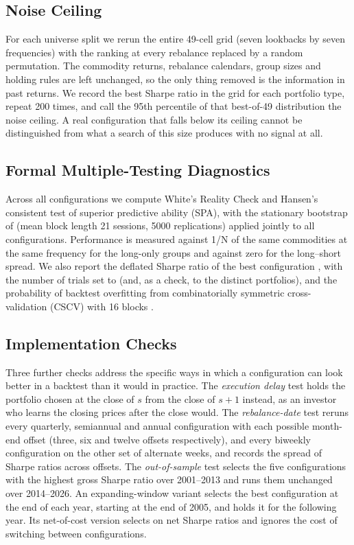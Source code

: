 \documentclass[commodities,article,submit,pdftex,moreauthors]{Definitions/mdpi}
\begin{document}
\subsection{Noise Ceiling}

For each universe split we rerun the entire 49-cell grid (seven lookbacks by seven frequencies) with the ranking at every rebalance replaced by a random permutation. The commodity returns, rebalance calendars, group sizes and holding rules are left unchanged, so the only thing removed is the information in past returns. We record the best Sharpe ratio in the grid for each portfolio type, repeat 200 times, and call the 95th percentile of that best-of-49 distribution the noise ceiling. A real configuration that falls below its ceiling cannot be distinguished from what a search of this size produces with no signal at all.

\subsection{Formal Multiple-Testing Diagnostics}

Across all \nConfigs{} configurations we compute White's Reality Check and Hansen's consistent test of superior predictive ability (SPA), with the stationary bootstrap of \citet{politis1994} (mean block length 21 sessions, 5000 replications) applied jointly to all configurations. Performance is measured against 1/N of the same commodities at the same frequency for the long-only groups and against zero for the long--short spread. We also report the deflated Sharpe ratio of the best configuration \citep{bailey2014}, with the number of trials set to \nConfigs{} (and, as a check, to the \nDistinct{} distinct portfolios), and the probability of backtest overfitting from combinatorially symmetric cross-validation (CSCV) with 16 blocks \citep{bailey2017}.

\subsection{Implementation Checks}

Three further checks address the specific ways in which a configuration can look better in a backtest than it would in practice. The \emph{execution delay} test holds the portfolio chosen at the close of $s$ from the close of $s+1$ instead, as an investor who learns the closing prices after the close would. The \emph{rebalance-date} test reruns every quarterly, semiannual and annual configuration with each possible month-end offset (three, six and twelve offsets respectively), and every biweekly configuration on the other set of alternate weeks, and records the spread of Sharpe ratios across offsets. The \emph{out-of-sample} test selects the five configurations with the highest gross Sharpe ratio over 2001--2013 and runs them unchanged over 2014--2026. An expanding-window variant selects the best configuration at the end of each year, starting at the end of 2005, and holds it for the following year. Its net-of-cost version selects on net Sharpe ratios and ignores the cost of switching between configurations.
\end{document}
